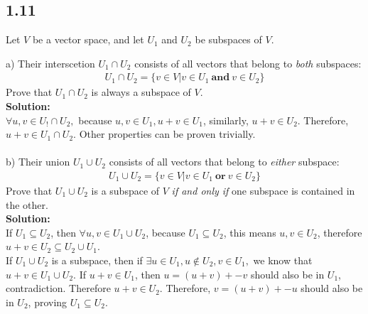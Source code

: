 \documentclass{article}
\begin{document}
\subsection{1.11}
Let $V$ be a vector space, and let $U_1$ and $U_2$ be subspaces of $V$.
\begin{addmargin}[1em]{0em}
a) Their interscetion $U_1 \cap U_2$ consists of all vectors that belong to \textit{both} subspaces:\\
    \begin{align*}
        U_1 \cap U_2 = \{v \in V |v \in U_1\ \textbf{and}\ v \in U_2\}
    \end{align*}
Prove that $U_1\cap U_2$ is always a subspace of $V$.\\
\textbf{Solution:}\\
$\forall u, v \in U_! \cap U_2,$ because $u, v \in U_1, u+v \in U_1$, similarly, $u+v \in U_2$. Therefore, $u+v \in U_1 \cap U_2$. Other properties can be proven trivially.\\\\
b) Their union $U_1 \cup U_2$ consists of all vectors that belong to \textit{either} subspace:
    \begin{align*}
        U_1 \cup U_2 = \{v \in V|v \in U_1\ \textbf{or}\ v \in U_2\}
    \end{align*}
Prove that $U_1 \cup U_2$ is a subspace of $V$ \textit{if and only if} one subspace is contained in the other.\\
\textbf{Solution:}\\
If $U_1 \subseteq U_2$, then $\forall u,v \in U_1 \cup U_2$, because $U_1 \subseteq U_2$, this means $u,v \in U_2$, therefore $u + v \in U_2 \subseteq U_2 \cup U_1$.\\
If $U_1 \cup U_2$ is a subspace, then if $\exists u \in U_1, u \notin U_2, v \in U_1,$ we know that $u+v \in U_1 \cup U_2$. If $u+v \in U_1$, then $u = (u+v) + -v$ should also be in $U_1$, contradiction. Therefore $u + v \in U_2$. Therefore, $v = (u+v) + -u$ should also be in $U_2$, proving $U_1 \subseteq U_2$.
\end{addmargin}
\end{document}
